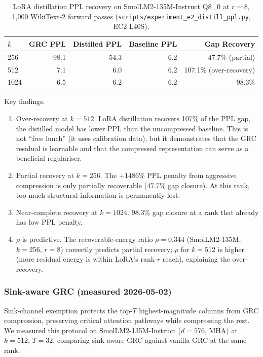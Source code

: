 \documentclass[11pt]{article}
\begin{document}
\begin{table}[h]\centering\small
\caption{LoRA distillation PPL recovery on SmolLM2-135M-Instruct Q8\_0
at $r{=}8$, 1,000 WikiText-2 forward passes
(\texttt{scripts/experiment\_e2\_distill\_ppl.py}, EC2 L40S).}
\label{tab:distill-ppl}
\begin{tabular}{@{}lrrrr@{}}
\toprule
$k$ & GRC PPL & Distilled PPL & Baseline PPL & Gap Recovery \\
\midrule
256  & 98.1  & 54.3  & 6.2  & $47.7\%$ (partial) \\
512  & 7.1   & 6.0 & 6.2  & 107.1\% (over-recovery) \\
1024 & 6.5   & 6.2   & 6.2  & $98.3\%$ \\
\bottomrule
\end{tabular}
\end{table}

Key findings.
\begin{enumerate}
\item Over-recovery at $k{=}512$.  LoRA distillation recovers
      107\% of the PPL gap, the distilled model has lower PPL
      than the uncompressed baseline.  This is not ``free lunch''
      (it uses calibration data), but it demonstrates that the GRC
      residual is learnable and that the compressed representation
      can serve as a beneficial regulariser.
\item Partial recovery at $k{=}256$.  The $+1486\%$ PPL
      penalty from aggressive compression is only partially recoverable
      ($47.7\%$ gap closure).  At this rank, too much structural
      information is permanently lost.
\item Near-complete recovery at $k{=}1024$.  $98.3\%$ gap
      closure at a rank that already has low PPL penalty.
\item $\rho$ is predictive.  The recoverable-energy ratio
      $\rho{=}0.344$ (SmolLM2-135M, $k{=}256$, $r{=}8$) correctly
      predicts partial recovery; $\rho$ for $k{=}512$ is higher
      (more residual energy is within LoRA's rank-$r$ reach), explaining
      the over-recovery.
\end{enumerate}

\subsubsection{Sink-aware GRC (measured 2026-05-02)}

Sink-channel exemption protects the top-$T$ highest-magnitude columns
from GRC compression, preserving critical attention pathways while
compressing the rest.  We measured this protocol on
SmolLM2-135M-Instruct ($d{=}576$, MHA) at $k{=}512$, $T{=}32$,
comparing sink-aware GRC against vanilla GRC at the same rank.
\end{document}
